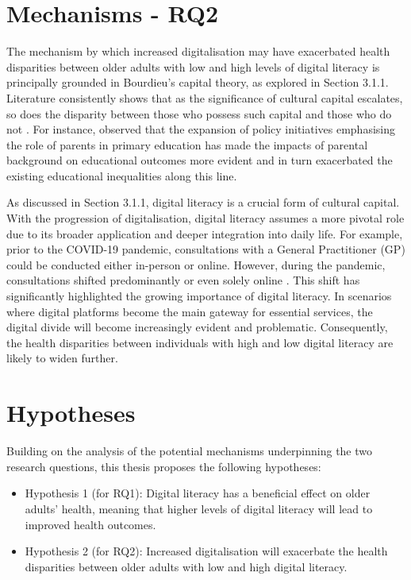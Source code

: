 \section{Mechanisms - RQ2}
The mechanism by which increased digitalisation may have exacerbated health disparities between older adults with low and high levels of digital literacy is principally grounded in Bourdieu's capital theory, as explored in Section 3.1.1. Literature consistently shows that as the significance of cultural capital escalates, so does the disparity between those who possess such capital and those who do not \parencite{bennett_introduction_2006}. For instance, \textcite{reay_education_2004} observed that the expansion of policy initiatives emphasising the role of parents in primary education has made the impacts of parental background on educational outcomes more evident and in turn exacerbated the existing educational inequalities along this line. 

As discussed in Section 3.1.1, digital literacy is a crucial form of cultural capital. With the progression of digitalisation, digital literacy assumes a more pivotal role due to its broader application and deeper integration into daily life. For example, prior to the COVID-19 pandemic, consultations with a General Practitioner (GP) could be conducted either in-person or online. However, during the pandemic, consultations shifted predominantly or even solely online \parencite{crawford_digital_2020}. This shift has significantly highlighted the growing importance of digital literacy. In scenarios where digital platforms become the main gateway for essential services, the digital divide will become increasingly evident and problematic. Consequently, the health disparities between individuals with high and low digital literacy are likely to widen further.

\section{Hypotheses}
Building on the analysis of the potential mechanisms underpinning the two research questions, this thesis proposes the following hypotheses:

\begin{itemize}
    \item Hypothesis 1 (for RQ1): Digital literacy has a beneficial effect on older adults' health, meaning that higher levels of digital literacy will lead to improved health outcomes.
    \item Hypothesis 2 (for RQ2): Increased digitalisation will exacerbate the health disparities between older adults with low and high digital literacy.
\end{itemize}